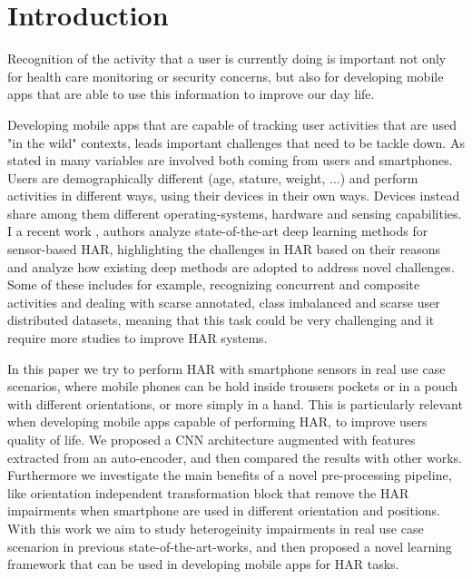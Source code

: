 
\section{Introduction}
\label{sec:introduction}
Recognition of the activity that a user is currently doing is important not only for health care monitoring or security concerns, but also for developing mobile apps that are able to use this information to improve our day life.

Developing mobile apps that are capable of tracking user activities that are used "in the wild" contexts, leads important challenges that need to be tackle down. As stated in \cite{blunck2013heterogeneity} many variables are involved both coming from users and smartphones. Users are demographically different (age, stature, weight, ...) and perform activities in different ways, using their devices in their own ways. Devices instead share among them different operating-systems, hardware and sensing capabilities.
I a recent work \cite{chen2020deep}, authors analyze state-of-the-art deep learning methods for sensor-based HAR, highlighting the challenges in HAR based on their reasons and analyze how existing deep methods are adopted to address novel challenges. Some of these includes for example, recognizing concurrent and composite activities and dealing with scarse annotated, class imbalanced and scarse user distributed datasets, meaning that this task could be very challenging and it require more studies to improve HAR systems.

In this paper we try to perform HAR with smartphone sensors in real use case scenarios, where mobile phones can be hold inside trousers pockets or in a pouch with different orientations, or more simply in a hand. This is particularly relevant when developing mobile apps capable of performing HAR, to improve users quality of life. We proposed a CNN architecture augmented with features extracted from an auto-encoder, and then compared the results with other works. Furthermore we investigate the main benefits of a novel pre-processing pipeline, like orientation independent transformation block that remove the HAR impairments when smartphone are used in different orientation and positions. With this work we aim to study heterogeinity impairments in real use case scenarion in previous state-of-the-art-works, and then proposed a novel learning framework that can be used in developing mobile apps for HAR tasks.

